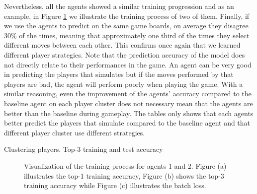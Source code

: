Nevertheless, all the agents showed a similar training progression and as an example, in Figure \ref{fig:nn_train} we illustrate the training process of two of them.  Finally, if we use the agents to predict on the same game boards, on average they disagree 30\% of the times, meaning that approximately one third of the times they select different moves between each other. This confirms once again that we learned different player strategies. Note that the prediction accuracy of the model does not directly relate to their performances in the game. An agent can be very good in predicting the players that simulates but if the moves performed by that players are bad, the agent will perform poorly when playing the game. With a similar reasoning, even the improvement of the agents' accuracy compared to the baseline agent on each player cluster does not necessary mean that the agents are better than the baseline during gameplay. The tables only shows that each agents better predict the players that simulate compared to the baseline agent and that different player cluster use different strategies.
\begin{table}[t]
    \centering
    \small
    \caption{Clustering players. Top-3 training and test accuracy} 
    
    \label{tab:Top3_training_test_accuracy}
\end{table} 
\begin{figure}        
\centering
    \subfloat[]{%
    
    \label{fig:train_acc_1}
    }
    \subfloat[]{%
    
    \label{fig:train_acc_3}
    }
    \subfloat[]{%
    
    \label{fig:train_batch_loss}
    }
    \caption{Visualization of the training process for agents 1 and 2. Figure (a) illustrates the top-1 training accuracy, Figure (b) shows the top-3 training accuracy while Figure (c) illustrates the batch loss. }
    \label{fig:nn_train}
\end{figure}

